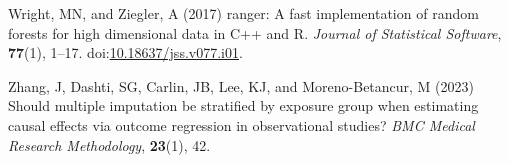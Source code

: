 \documentclass[
  single column]{article}
\newlength{\cslhangindent}
\newenvironment{CSLReferences}[2] %
 {\begin{list}{}{%
  \setlength{\itemindent}{0pt}
  \setlength{\leftmargin}{0pt}
  \setlength{\parsep}{0pt}
  \ifodd #1
   \setlength{\leftmargin}{\cslhangindent}
   \setlength{\itemindent}{-1\cslhangindent}
  \fi
  \setlength{\itemsep}{#2\baselineskip}}}
 {\end{list}}
\begin{document}
\begin{CSLReferences}{1}{0}
Wright, MN, and Ziegler, A (2017) {ranger}: A fast implementation of
random forests for high dimensional data in {C++} and {R}. \emph{Journal
of Statistical Software}, \textbf{77}(1), 1--17.
doi:\href{https://doi.org/10.18637/jss.v077.i01}{10.18637/jss.v077.i01}.

Zhang, J, Dashti, SG, Carlin, JB, Lee, KJ, and Moreno-Betancur, M (2023)
Should multiple imputation be stratified by exposure group when
estimating causal effects via outcome regression in observational
studies? \emph{BMC Medical Research Methodology}, \textbf{23}(1), 42.

\end{CSLReferences}
\end{document}
